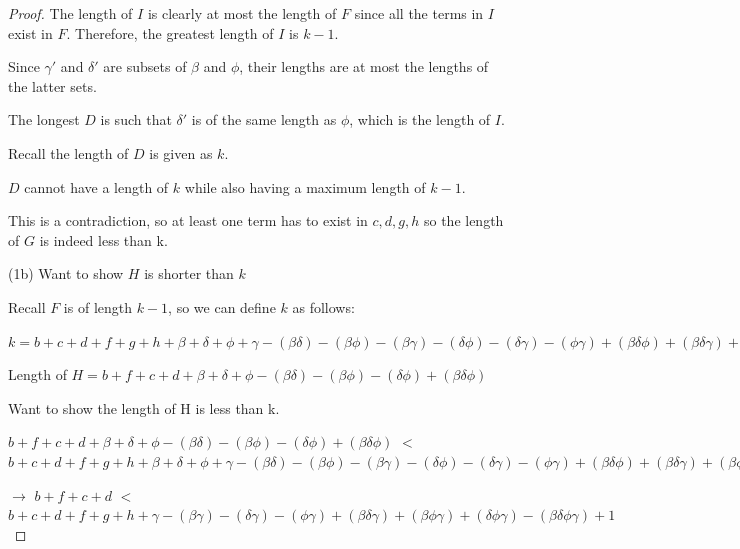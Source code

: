 \documentclass[manuscript]{acmart}
\begin{document}
\begin{proof}
        The length of $I$ is clearly at most the length of $F$ since
        all the terms in $I$ exist in $F$. Therefore, the greatest length
        of $I$ is $k-1$. 
        
        Since $\gamma'$ and $\delta'$ are subsets of $\beta$ and $\phi$, 
        their lengths are at most the lengths of the latter sets.

        The longest $D$ is such that $\delta'$ is of the same length as
        $\phi$, which is the length of $I$.
        
        Recall the length of $D$ is given as $k$.

        $D$ cannot have a length of $k$ while also having a maximum length
        of $k - 1$.

        This is a contradiction, so at least one term has to exist in {$c, d, g, h$}
        so the length of $G$ is indeed less than k.

        (1b) Want to show $H$ is shorter than $k$

        Recall $F$ is of length $k - 1$, so we can define $k$ as follows:

        $k = b + c + d + f + g + h 
        + \beta + \delta + \phi + \gamma
        - (\beta \delta) - (\beta \phi) - (\beta \gamma) - (\delta \phi) - (\delta \gamma) - (\phi \gamma)
        + (\beta \delta \phi) + (\beta \delta \gamma) + (\beta \phi \gamma) + (\delta \phi \gamma)
        - (\beta \delta \phi \gamma)
        + 1
        $

        Length of $H = b + f + c + d 
        + \beta + \delta + \phi
        - (\beta \delta) - (\beta \phi) - (\delta \phi)
        + (\beta \delta \phi) $

        Want to show the length of H is less than k.

        $b + f + c + d 
        + \beta + \delta + \phi
        - (\beta \delta) - (\beta \phi) - (\delta \phi)
        + (\beta \delta \phi) $
        $<$
        $b + c + d + f + g + h 
        + \beta + \delta + \phi + \gamma
        - (\beta \delta) - (\beta \phi) - (\beta \gamma) - (\delta \phi) - (\delta \gamma) - (\phi \gamma)
        + (\beta \delta \phi) + (\beta \delta \gamma) + (\beta \phi \gamma) + (\delta \phi \gamma)
        - (\beta \delta \phi \gamma)
        + 1
        $

        $\rightarrow$
        $b + f + c + d$
        $<$
        $b + c + d + f + g + h 
        + \gamma
        - (\beta \gamma) - (\delta \gamma) - (\phi \gamma)
        + (\beta \delta \gamma) + (\beta \phi \gamma) + (\delta \phi \gamma)
        - (\beta \delta \phi \gamma)
        + 1
        $


\end{proof}
\end{document}
